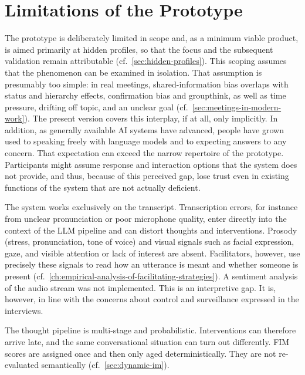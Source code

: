 \section{Limitations of the Prototype}
\label{sec:limitations-of-prototype}

The prototype is deliberately limited in scope and, as a minimum viable product, is aimed primarily
at hidden profiles, so that the focus and the subsequent validation remain attributable
(cf.\ \autoref{sec:hidden-profiles}).
This scoping assumes that the phenomenon can be examined in isolation. That assumption
is presumably too simple: in real meetings, shared-information bias overlaps with status and
hierarchy effects, confirmation bias and groupthink, as well as time pressure, drifting off topic, and
an unclear goal (cf.\ \autoref{sec:meetings-in-modern-work}).
The present version covers this interplay, if at all, only implicitly.
In addition, as generally available AI systems have advanced, people have grown used to speaking
freely with language models and to expecting answers to any concern.
That expectation can exceed the narrow repertoire of the prototype. Participants
might assume response and interaction options that the system does not provide, and thus, because of
this perceived gap, lose trust even in existing functions of the
system that are not actually deficient.

The system works exclusively on the transcript.
Transcription errors, for instance from unclear pronunciation or poor microphone quality, enter
directly into the context of the LLM pipeline and can distort thoughts and interventions.
Prosody (stress, pronunciation, tone of voice) and visual signals such as facial expression, gaze, and
visible attention or lack of interest are absent.
Facilitators, however, use precisely these signals to read how an utterance is meant and whether
someone is present (cf.\ \autoref{ch:empirical-analysis-of-facilitating-strategies}).
A sentiment analysis of the audio stream was not implemented.
This is an interpretive gap. It is, however, in line with the concerns about control and
surveillance expressed in the interviews.

The thought pipeline is multi-stage and probabilistic. Interventions can therefore arrive
late, and the same conversational situation can turn out differently.
FIM scores are assigned once and then only aged deterministically. They are not
re-evaluated semantically (cf.\ \autoref{sec:dynamic-im}).

